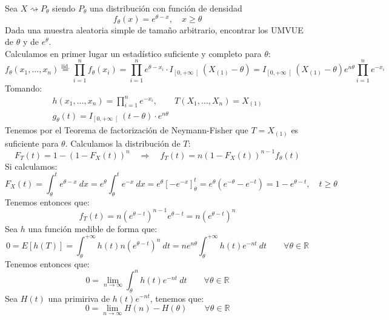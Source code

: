 \begin{ejercicio}\label{ej:7_rel4}
    Sea $X\rightsquigarrow P_\theta$ siendo $P_\theta$ una distribución con función de densidad
    \begin{equation*}
        f_\theta(x) = e^{\theta-x}, \quad x\geq \theta
    \end{equation*}
    Dada una muestra aleatoria simple de tamaño arbitrario, encontrar los UMVUE de $\theta$ y de $e^{\theta}$.\\

    \noindent
    Calculamos en primer lugar un estadístico suficiente y completo para $\theta$:
    \begin{equation*}
        f_\theta(x_1, \ldots, x_n) \stackrel{\text{iid.}}{=} \prod_{i=1}^{n}f_\theta(x_i) = \prod_{i=1}^{n} e^{\theta-x_i} \cdot I_{\left[0,+\infty\right[}(X_{(1)}-\theta)=I_{\left[0,+\infty\right[}(X_{(1)}-\theta) e^{n\theta}\prod_{i=1}^{n} e^{-x_i}
    \end{equation*}
    Tomando:
    \begin{gather*}
        h(x_1, \ldots, x_n) = \prod_{i=1}^{n}e^{-x_i}, \qquad T(X_1, \ldots, X_n) = X_{(1)} \\
        g_\theta(t) = I_{\left[0,+\infty\right[}(t-\theta) \cdot e^{n\theta}
    \end{gather*}
    Tenemos por el Teorema de factorización de Neymann-Fisher que $T=X_{(1)}$ es suficiente para $\theta$. Calculamos la distribución de $T$:
    \begin{equation*}
        F_T(t) = 1-{(1-F_X(t))}^{n} \quad \Longrightarrow \quad f_T(t) = n{(1-F_X(t))}^{n-1}f_\theta(t)
    \end{equation*}
    Si calculamos:
    \begin{equation*}
        F_X(t) = \int_{\theta}^{t} e^{\theta-x}~dx  = e^{\theta}\int_{\theta}^{t} e^{-x}~dx  = e^{\theta}[-e^{-x}]_\theta^t = e^{\theta}\left(e^{-\theta} - e^{-t}\right) = 1- e^{\theta-t}, \quad t\geq \theta
    \end{equation*}
    Tenemos entonces que:
    \begin{equation*}
        f_T(t) = n{\left(e^{\theta-t}\right)}^{n-1} e^{\theta-t} = n{\left(e^{\theta-t}\right)}^{n}
    \end{equation*}
    Sea $h$ una función medible de forma que:
    \begin{equation*}
        0 = E[h(T)] = \int_{\theta}^{+\infty} h(t)n{\left(e^{\theta-t}\right)}^{n}~dt  = ne^{n\theta} \int_{\theta}^{+\infty}h(t)e^{-nt} ~dt \qquad \forall \theta\in \mathbb{R}
    \end{equation*}
    Tenemos entonces que:
    \begin{equation*}
        0 = \lim_{n\to\infty}\int_{\theta}^{n} h(t)e^{-nt}~dt  \qquad \forall \theta\in \mathbb{R}
    \end{equation*}
    Sea $H(t)$ una primiriva de $h(t)e^{-nt}$, tenemos que:
    \begin{equation*}
        0 = \lim_{n\to\infty}H(n)-H(\theta)\qquad \forall \theta\in \mathbb{R}
    \end{equation*}


\end{ejercicio}
